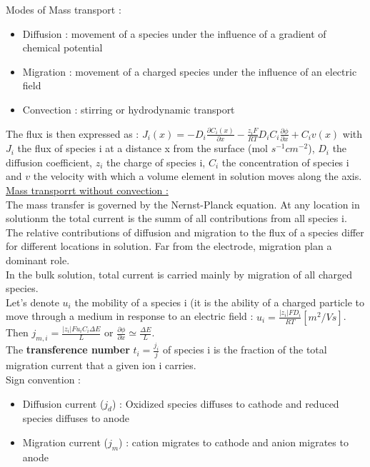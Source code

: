 \documentclass[../main.tex]{subfiles}
\begin{document}
Modes of Mass transport : \begin{itemize}
    \item Diffusion : movement of a species under the influence of a gradient of chemical potential
    \item Migration : movement of a charged species under the influence of an electric field
    \item Convection : stirring or hydrodynamic transport
\end{itemize}

The flux is then expressed as : $J_i(x) = -D_i \frac{\partial C_i(x)}{\partial x} - \frac{z_i F}{RT} D_iC_i \frac{\partial \phi}{\partial x} + C_i v(x)$ with $J_i$ the flux of species i at a distance x from the surface (mol $s^{-1} cm^{-2}$), $D_i$ the diffusion coefficient, $z_i$ the charge of species i, $C_i$ the concentration of species i and $v$ the velocity with which a volume element in solution moves along the axis.\\

\quad \underline{Mass transporrt without convection :}\\
The mass transfer is governed by the Nernst-Planck equation. At any location in solutionm the total current is the summ of all contributions from all species i. The relative contributions of diffusion and migration to the flux of a species differ for different locations in solution. Far from the electrode, migration plan a dominant role.\\

In the bulk solution, total current is carried mainly by migration of all charged species. \\
Let's denote $u_i$ the mobility of a species i (it is the ability of a charged particle to move through a medium in response to an electric field : $u_i = \frac{\lvert z_i \rvert FD_i}{RT} [m^2 /Vs]$.\\
Then $j_{m,i} = \frac{\lvert z_i \rvert F u_i C_i \Delta E}{L}$ or $\frac{\partial \phi}{\partial x} \simeq \frac{\Delta E}{L}$.\\

The \textbf{transference number} $t_i = \frac{j_i}{j}$ of species i is the fraction of the total migration current that a given ion i carries.\\
Sign convention : \begin{itemize}
    \item Diffusion current ($j_d$) : Oxidized species diffuses to cathode and reduced species diffuses to anode
    \item Migration current ($j_m$) : cation migrates to cathode and anion migrates to anode
\end{itemize}
\end{document}
